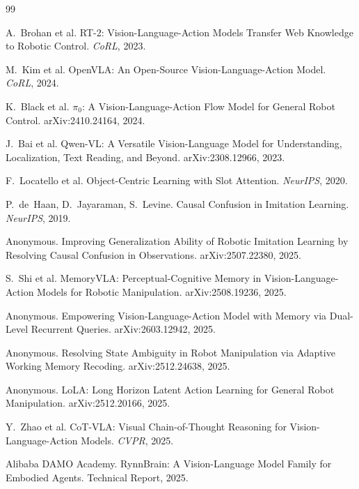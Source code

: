 \documentclass[11pt]{ctexart}
\begin{document}

\begin{thebibliography}{99}

A.~Brohan et al.
\newblock RT-2: Vision-Language-Action Models Transfer Web Knowledge to Robotic Control.
\newblock \emph{CoRL}, 2023.

M.~Kim et al.
\newblock OpenVLA: An Open-Source Vision-Language-Action Model.
\newblock \emph{CoRL}, 2024.

K.~Black et al.
\newblock $\pi_0$: A Vision-Language-Action Flow Model for General Robot Control.
\newblock arXiv:2410.24164, 2024.

J.~Bai et al.
\newblock Qwen-VL: A Versatile Vision-Language Model for Understanding, Localization, Text Reading, and Beyond.
\newblock arXiv:2308.12966, 2023.

F.~Locatello et al.
\newblock Object-Centric Learning with Slot Attention.
\newblock \emph{NeurIPS}, 2020.

P.~de~Haan, D.~Jayaraman, S.~Levine.
\newblock Causal Confusion in Imitation Learning.
\newblock \emph{NeurIPS}, 2019.

Anonymous.
\newblock Improving Generalization Ability of Robotic Imitation Learning by Resolving Causal Confusion in Observations.
\newblock arXiv:2507.22380, 2025.

S.~Shi et al.
\newblock MemoryVLA: Perceptual-Cognitive Memory in Vision-Language-Action Models for Robotic Manipulation.
\newblock arXiv:2508.19236, 2025.

Anonymous.
\newblock Empowering Vision-Language-Action Model with Memory via Dual-Level Recurrent Queries.
\newblock arXiv:2603.12942, 2025.

Anonymous.
\newblock Resolving State Ambiguity in Robot Manipulation via Adaptive Working Memory Recoding.
\newblock arXiv:2512.24638, 2025.

Anonymous.
\newblock LoLA: Long Horizon Latent Action Learning for General Robot Manipulation.
\newblock arXiv:2512.20166, 2025.

Y.~Zhao et al.
\newblock CoT-VLA: Visual Chain-of-Thought Reasoning for Vision-Language-Action Models.
\newblock \emph{CVPR}, 2025.

Alibaba DAMO Academy.
\newblock RynnBrain: A Vision-Language Model Family for Embodied Agents.
\newblock Technical Report, 2025.

\end{thebibliography}
\end{document}
